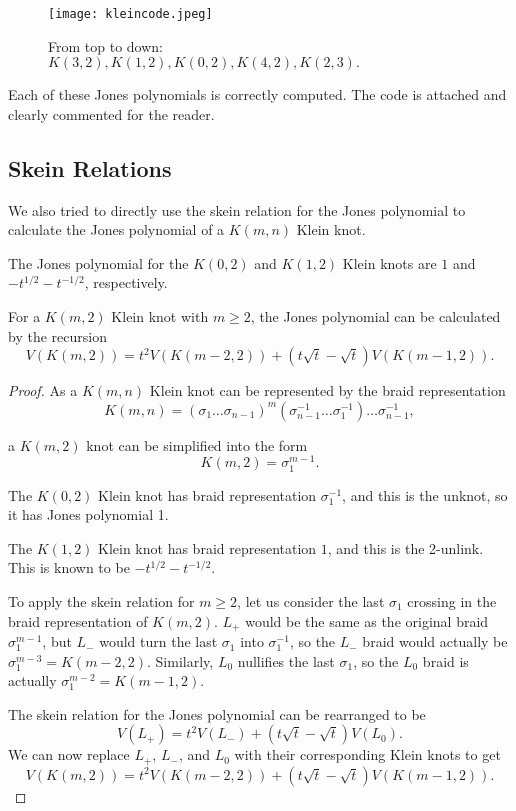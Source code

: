 \documentclass[12pt]{article}
\newenvironment{theorem}[2][Theorem]{\begin{trivlist}
\item[\hskip \labelsep {\bfseries #1}\hskip \labelsep {\bfseries #2.}]}{\end{trivlist}}
\begin{document}
\begin{figure}[H]
\centering
\texttt{[image: kleincode.jpeg]}
\caption{\label{code} From top to down: $K(3, 2), K(1, 2), K(0, 2), K(4, 2), K(2, 3).$}
\end{figure}

Each of these Jones polynomials is correctly computed. The code is attached and clearly commented for the reader. 


\subsection{Skein Relations}

We also tried to directly use the skein relation for the Jones polynomial to calculate the Jones polynomial of a $K(m, n)$ Klein knot.

\begin{theorem}{3.4}

The Jones polynomial for the $K(0, 2)$ and $K(1, 2)$ Klein knots are $1$ and $-t^{1/2} - t^{-1/2}$, respectively. 

For a $K(m, 2)$ Klein knot with $m \geq 2$, the Jones polynomial can be calculated by the recursion  $$V(K(m, 2)) = t^2 V(K(m - 2, 2)) + (t \sqrt{t} - \sqrt{t}) V(K(m - 1, 2)).$$

\end{theorem}

\begin{proof}

As a $K(m, n)$ Klein knot can be represented by the braid representation $$K(m, n) = (\sigma_1 \dots \sigma_{n - 1})^m (\sigma_{n - 1}^{-1} \dots \sigma_1^{-1}) \dots \sigma_{n - 1}^{-1},$$

a $K(m, 2)$ knot can be simplified into the form $$K(m, 2) = \sigma_1^{m - 1}.$$

The $K(0, 2)$ Klein knot has braid representation $\sigma_1^{-1}$, and this is the unknot, so it has Jones polynomial 1. 

The $K(1, 2)$ Klein knot has braid representation $1$, and this is the 2-unlink. This is known to be $- t^{1/2} - t^{-1/2}.$ 

To apply the skein relation for $m \geq 2$, let us consider the last $\sigma_1$ crossing in the braid representation of $K(m, 2)$. $L_+$ would be the same as the original braid $\sigma_1^{m - 1}$, but $L_-$ would turn the last $\sigma_1$ into $\sigma_1^{-1}$, so the $L_-$ braid would actually be $\sigma_1^{m - 3} = K(m - 2, 2)$. Similarly, $L_0$ nullifies the last $\sigma_1$, so the $L_0$ braid is actually $\sigma_1^{m - 2} = K(m - 1, 2)$. 

The skein relation for the Jones polynomial can be rearranged to be $$V(L_+) = t^2 V(L_-) + (t \sqrt{t} - \sqrt{t}) V(L_0).$$ We can now replace $L_+$, $L_-$, and $L_0$ with their corresponding Klein knots to get $$V(K(m, 2)) = t^2 V(K(m - 2, 2)) + (t \sqrt{t} - \sqrt{t}) V(K(m - 1, 2)).$$

\end{proof}
\end{document}
